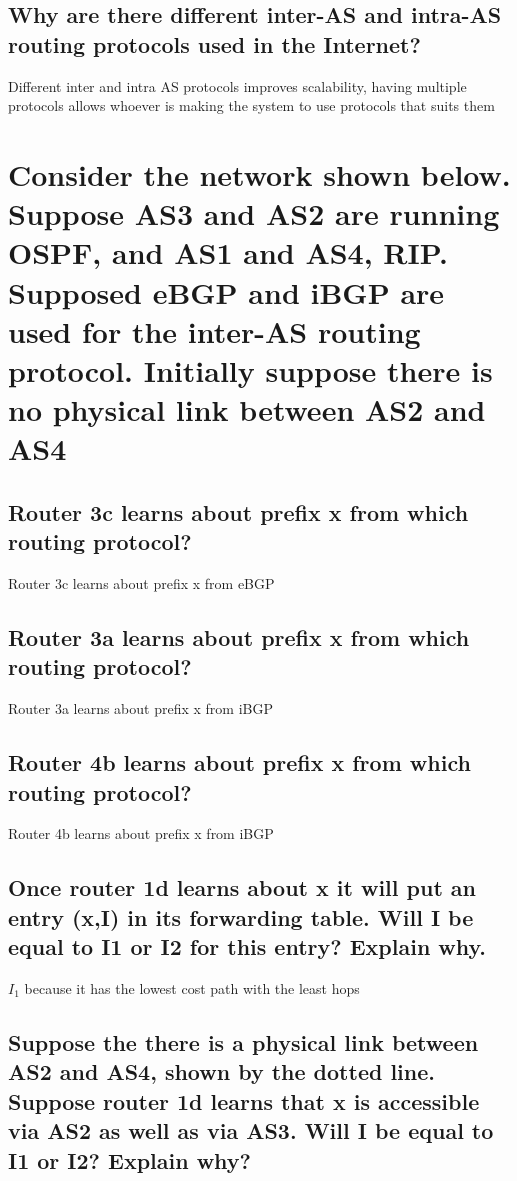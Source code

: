 \documentclass[10pt,letterpaper]{article}
\begin{document}
\subsection{Why are there different inter-AS and intra-AS routing protocols used in the Internet?}
Different inter and intra AS protocols improves scalability, having multiple protocols allows whoever is making the system to use protocols that suits them

\section{Consider the network shown below. Suppose AS3 and AS2 are running OSPF, and AS1 and AS4, RIP. Supposed eBGP and iBGP are used for the inter-AS routing protocol. Initially suppose there is no physical link between AS2 and AS4}

\subsection{Router 3c learns about prefix x from which routing protocol?}
Router 3c learns about prefix x from eBGP

\subsection{Router 3a learns about prefix x from which routing protocol?}
Router 3a learns about prefix x from iBGP

\subsection{Router 4b learns about prefix x from which routing protocol?}
Router 4b learns about prefix x from iBGP

\subsection{Once router 1d learns about x it will put an entry (x,I) in its forwarding table. Will I be equal to I1 or I2 for this entry?  Explain why.}
$I_{1}$ because it has the lowest cost path with the least hops

\subsection{Suppose  the  there  is  a  physical  link  between  AS2  and  AS4,  shown  by  the  dotted  line. Suppose router 1d learns that x is accessible via AS2 as well as via AS3. Will I be equal to I1 or I2? Explain why?}
\end{document}
